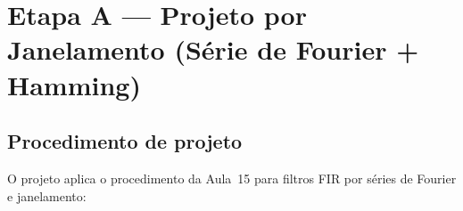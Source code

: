 \documentclass[11pt,a4paper]{article}
\begin{document}
\section{Etapa A — Projeto por Janelamento (Série de Fourier + Hamming)}
\label{sec:etapaA}

\subsection{Procedimento de projeto}

O projeto aplica o procedimento da Aula~15 para filtros FIR por séries de Fourier e janelamento:
\end{document}
